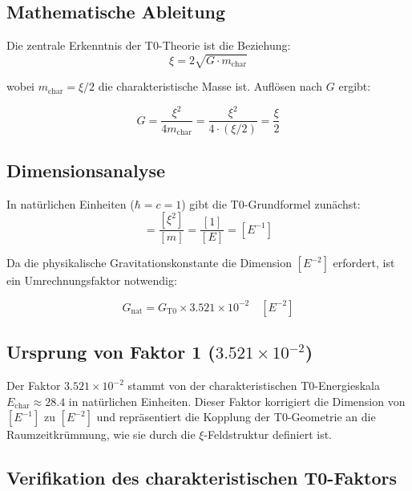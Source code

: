 \documentclass[12pt,a4paper]{report}
\begin{document}
	\subsection{Mathematische Ableitung}
	
	Die zentrale Erkenntnis der T0-Theorie ist die Beziehung:
	\begin{equation}
		\xi = 2\sqrt{G \cdot m_{\text{char}}}
	\end{equation}
	
	wobei $m_{\text{char}} = \xi/2$ die charakteristische Masse ist. Auflösen nach $G$ ergibt:
	
	\begin{equation}
		\boxed{G = \frac{\xi^2}{4m_{\text{char}}} = \frac{\xi^2}{4 \cdot (\xi/2)} = \frac{\xi}{2}}
	\end{equation}
	
	\subsection{Dimensionsanalyse}
	
	In natürlichen Einheiten ($\hbar = c = 1$) gibt die T0-Grundformel zunächst:
	\begin{equation}
		[G_{\text{T0}}] = \frac{[\xi^2]}{[m]} = \frac{[1]}{[E]} = [E^{-1}]
	\end{equation}
	
	Da die physikalische Gravitationskonstante die Dimension $[E^{-2}]$ erfordert, ist ein Umrechnungsfaktor notwendig:
	
	\begin{equation}
		G_{\text{nat}} = G_{\text{T0}} \times 3.521 \times 10^{-2} \quad [E^{-2}]
	\end{equation}
	
	\subsection{Ursprung von Faktor 1 ($3.521 \times 10^{-2}$)}
	
	Der Faktor $3.521 \times 10^{-2}$ stammt von der charakteristischen T0-Energieskala $E_{\text{char}} \approx 28.4$ in natürlichen Einheiten. Dieser Faktor korrigiert die Dimension von $[E^{-1}]$ zu $[E^{-2}]$ und repräsentiert die Kopplung der T0-Geometrie an die Raumzeitkrümmung, wie sie durch die $\xi$-Feldstruktur definiert ist.
	
	\subsection{Verifikation des charakteristischen T0-Faktors}
	
\end{document}
